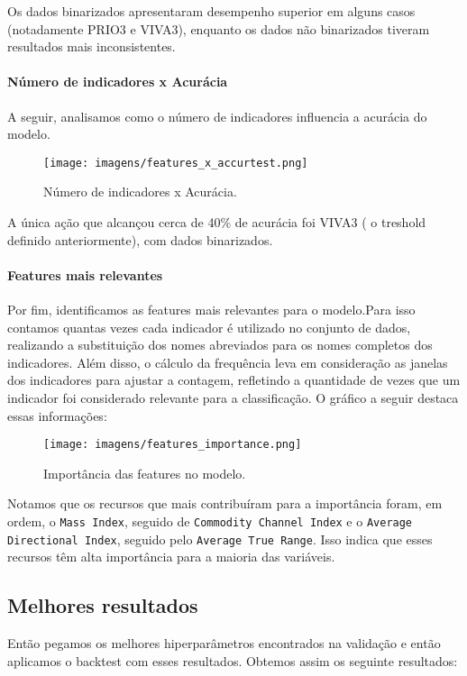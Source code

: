 \documentclass{article}
\begin{document}
Os dados binarizados apresentaram desempenho superior em alguns casos (notadamente PRIO3 e VIVA3), enquanto os dados não binarizados tiveram resultados mais inconsistentes.

\paragraph{Número de indicadores x Acurácia}
A seguir, analisamos como o número de indicadores influencia a acurácia do modelo.

\begin{figure}[H]
    \centering
    \texttt{[image: imagens/features\_x\_accurtest.png]}
    \caption{Número de indicadores x Acurácia.}
    \label{fig:features-acuracia}
\end{figure}

A única ação que alcançou cerca de 40\% de acurácia foi VIVA3 ( o treshold definido anteriormente), com dados binarizados.

\paragraph{Features mais relevantes}
Por fim, identificamos as features mais relevantes para o modelo.Para isso contamos quantas vezes cada indicador é utilizado no conjunto de dados, realizando a substituição dos nomes abreviados para os nomes completos dos indicadores. Além disso, o cálculo da frequência leva em consideração as janelas dos indicadores para ajustar a contagem, refletindo a quantidade de vezes que um indicador foi considerado relevante para a classificação. O gráfico a seguir destaca essas informações:

\begin{figure}[H]
    \centering
    \texttt{[image: imagens/features\_importance.png]}
    \caption{Importância das features no modelo.}
    \label{fig:features-importance}
\end{figure}

Notamos que os recursos que mais contribuíram para a importância foram, em ordem, o \texttt{Mass Index}, seguido de \texttt{Commodity Channel Index} e o \texttt{Average Directional Index}, seguido pelo \texttt{Average True Range}. Isso indica que esses recursos têm alta importância para a maioria das variáveis.


\subsection{Melhores resultados}
Então pegamos os melhores hiperparâmetros encontrados na validação e então aplicamos o backtest com esses resultados. Obtemos assim os seguinte resultados:
\end{document}
